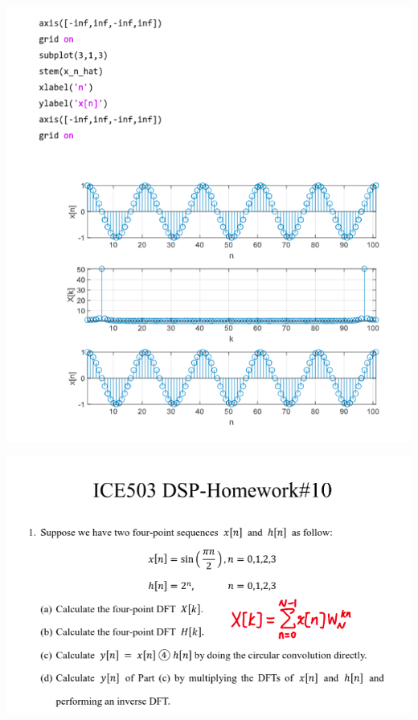 \documentclass[a4paper]{article}
\begin{document}
	
	\begin{center}
		\includegraphics[width=1\linewidth]{screenshot097}
	\end{center}
	
	
\newpage


\begin{center}
	\includegraphics[width=1\linewidth]{screenshot098}
\end{center}
\end{document}
